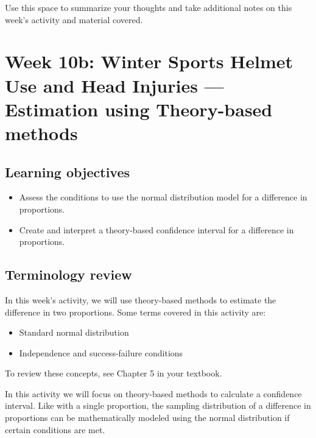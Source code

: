 \documentclass[
]{report}
\begin{document}
Use this space to summarize your thoughts and take additional notes on this week's activity and material covered.

\newpage

\hypertarget{week-10b-winter-sports-helmet-use-and-head-injuries-estimation-using-theory-based-methods}{%
\section{Week 10b: Winter Sports Helmet Use and Head Injuries --- Estimation using Theory-based methods}\label{week-10b-winter-sports-helmet-use-and-head-injuries-estimation-using-theory-based-methods}}


\hypertarget{learning-objectives-16}{%
\subsection{Learning objectives}\label{learning-objectives-16}}

\begin{itemize}
\item
  Assess the conditions to use the normal distribution model for a difference in proportions.
\item
  Create and interpret a theory-based confidence interval for a difference in proportions.
\end{itemize}

\hypertarget{terminology-review-18}{%
\subsection{Terminology review}\label{terminology-review-18}}

In this week's activity, we will use theory-based methods to estimate the difference in two proportions. Some terms covered in this activity are:

\begin{itemize}
\item
  Standard normal distribution
\item
  Independence and success-failure conditions
\end{itemize}

To review these concepts, see Chapter 5 in your textbook.

In this activity we will focus on theory-based methods to calculate a confidence interval. Like with a single proportion, the sampling distribution of a difference in proportions can be mathematically modeled using the normal distribution if certain conditions are met.
\end{document}
